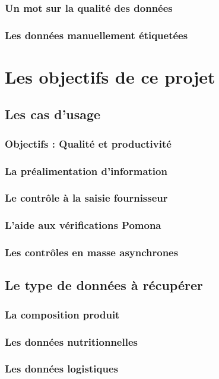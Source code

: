 \documentclass{report}
\begin{document}
        \section{Un mot sur la qualité des données}
        \section{Les données \og manuellement étiquetées \fg}
\part{Les objectifs de ce projet}
    \chapter{Les cas d'usage}
        \section{Objectifs : Qualité et productivité}
        \section{La préalimentation d'information}
        \section{Le contrôle à la saisie fournisseur}
        \section{L'aide aux vérifications Pomona}
        \section{Les contrôles en masse asynchrones}
    \chapter{Le type de données à récupérer}
        \section{La composition produit}
        \section{Les données nutritionnelles}
        \section{Les données logistiques}
\end{document}
